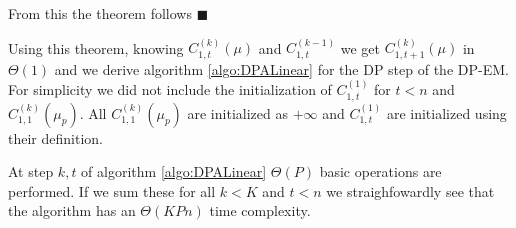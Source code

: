 \documentclass[article,10pt]{llncs}
\begin{document}
From this the theorem follows $\blacksquare$

Using this theorem, knowing $C_{1, t}^{(k)}(\mu)$ and $C_{1, t}^{(k-1)}$ we get $C_{1, t+1}^{(k)}(\mu)$ in $\Theta(1)$
and we derive algorithm \ref{algo:DPALinear} for the DP step of the DP-EM.
For simplicity we did not include the initialization of $C^{(1)}_{1,t}$ for $t < n$ and $C^{(k)}_{1,1}(\mu_p)$.
All $C^{(k)}_{1,1}(\mu_p)$ are initialized as $+\infty$ and $C^{(1)}_{1,t}$ are initialized using their definition.


At step $k, t$ of algorithm \ref{algo:DPALinear}  $\Theta(P)$ basic operations are performed. 
If we sum these for all $k < K$ and $t < n$  we straighfowardly see that the algorithm has an $\Theta(KPn)$ time complexity.
\end{document}
